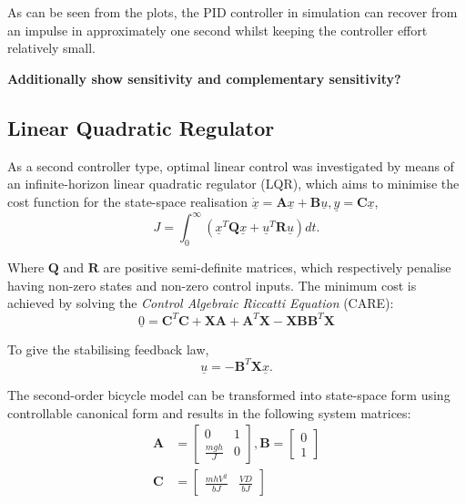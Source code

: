 As can be seen from the plots, the PID controller in simulation can recover from an impulse in approximately one second whilst keeping the controller effort relatively small.

\textbf{Additionally show sensitivity and complementary sensitivity?}

\subsection{Linear Quadratic Regulator}
As a second controller type, optimal linear control was investigated by means of an infinite-horizon linear quadratic regulator (LQR), which aims to minimise the cost function for the state-space realisation $\underline{\dot{x}}=\mathbf{A} \underline{x} + \mathbf{B} \underline{u}, \underline{y} = \mathbf{C} \underline{x}$,
\begin{equation*}
J = \int_{0}^{\infty} (\underline{x}^T \mathbf{Q} \underline{x} + \underline{u}^T \mathbf{R} \underline{u}) dt.
\end{equation*}

Where $\mathbf{Q}$ and $\mathbf{R}$ are positive semi-definite matrices, which respectively penalise having non-zero states and non-zero control inputs. The minimum cost is achieved by solving the \textit{Control Algebraic Riccatti Equation} (CARE):
\begin{equation*}
\underline{0} = \mathbf{C}^T \mathbf{C} + \mathbf{X} \mathbf{A} + \mathbf{A}^T \mathbf{X} - \mathbf{X} \mathbf{B} \mathbf{B}^T \mathbf{X}
\end{equation*}

To give the stabilising feedback law,
\begin{equation*}
\underline{u} = -\mathbf{B}^T \mathbf{X} \underline{x}.
\end{equation*}

The second-order bicycle model can be transformed into state-space form using controllable canonical form and results in the following system matrices:
\begin{align*}
\mathbf{A} &= \begin{bmatrix}
0 & 1 \\
\frac{m g h}{J} & 0
\end{bmatrix}, 
\mathbf{B} = \begin{bmatrix}
0 \\ 1
\end{bmatrix} \\
\mathbf{C} &= \begin{bmatrix}
\frac{m h V^2}{b J} & \frac{V D}{b J}
\end{bmatrix}
\end{align*}

